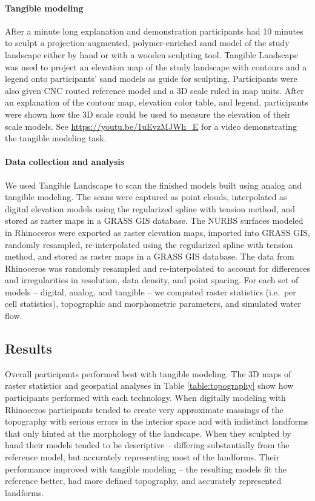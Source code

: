 \documentclass[Afour,sagev,times]{sagej} %
\begin{document}
\paragraph{Tangible modeling}
After a minute long explanation and demonstration
participants had 10 minutes to sculpt
a projection-augmented, polymer-enriched sand model
of the study landscape 
either by hand or with a wooden sculpting tool.
Tangible Landscape was used to project 
an elevation map of the study landscape
with contours and a legend
onto participants' sand models as guide for sculpting. 
Participants were also given CNC routed reference model and 
a 3D scale ruled in map units. 
After an explanation of the contour map, elevation color table, and legend,
participants were shown how the 3D scale could be used to 
measure the elevation of their scale models.
See \url{https://youtu.be/1uEvzMJWh_E}
for a video demonstrating the tangible modeling task.

\paragraph{Data collection and analysis}
We used Tangible Landscape to scan the finished models 
built using analog and tangible modeling.
The scans were captured as point clouds, interpolated 
as digital elevation models 
using the regularized spline with tension method,
and stored as raster maps in a GRASS GIS database. 
The NURBS surfaces modeled in Rhinoceros 
were exported as raster elevation maps,
imported into GRASS GIS, randomly resampled, 
re-interpolated using the regularized spline with tension method, 
and stored as raster maps in a GRASS GIS database. 
The data from Rhinoceros 
was randomly resampled and re-interpolated to account for 
differences and irregularities in resolution, data density, and point spacing.
For each set of models -- digital, analog, and tangible --
we computed raster statistics (i.e.~per cell statistics), 
topographic and morphometric parameters, 
and simulated water flow.

\subsection{Results}
Overall participants performed best with tangible modeling.
%
The 3D maps of raster statistics and geospatial analyses in
Table \ref{table:topography} 
show how participants performed with each technology.
%
When digitally modeling with Rhinoceros 
participants tended to 
create very approximate massings of the topography
with serious errors in the interior space and
with indistinct landforms
that only hinted at the morphology of the landscape.
%
When they sculpted by hand
their models tended to be descriptive -- 
differing substantially from the reference model, but
accurately representing most of the landforms. 
%
Their performance improved 
with tangible modeling --
the resulting models
fit the reference better, 
had more defined topography, 
and accurately represented landforms.
\end{document}
